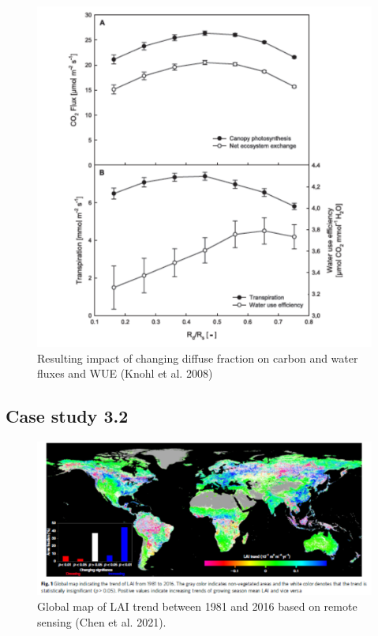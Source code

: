 \documentclass[12pt,oneside]{book}
\begin{document}
\begin{figure}

{\centering \includegraphics[width=0.8\linewidth]{figures/chap3/f333_knohl2} 

}

\caption{Resulting impact of changing diffuse fraction on carbon and water fluxes and WUE (Knohl et al. 2008)}\label{fig:f333}
\end{figure}

\subsection{Case study 3.2}\label{case-study-3.2}

\begin{figure}

{\centering \includegraphics[width=0.8\linewidth]{figures/chap3/f334_chen1} 

}

\caption{Global map of LAI trend between 1981 and 2016 based on remote sensing (Chen et al. 2021).}\label{fig:f334}
\end{figure}
\end{document}
